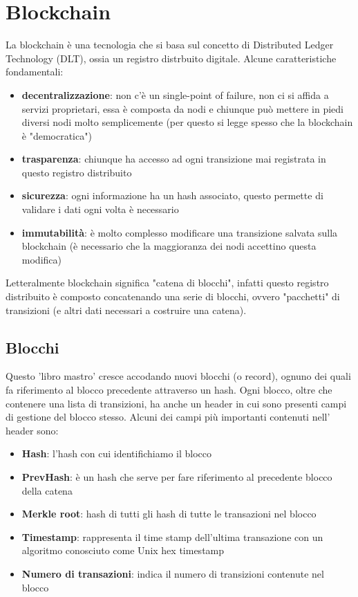 \section{Blockchain}
La blockchain è una tecnologia che si basa sul concetto di Distributed Ledger Technology (DLT), ossia un registro distrbuito digitale. Alcune caratteristiche fondamentali:
\begin{itemize}
  \item {\bfseries decentralizzazione}: non c'è un single-point of failure, non ci si affida a servizi proprietari, essa è composta da nodi e chiunque può mettere in piedi diversi nodi molto semplicemente (per questo si legge spesso che la blockchain è "democratica")
  \item {\bfseries trasparenza}: chiunque ha accesso ad ogni transizione mai registrata in questo registro distribuito
  \item {\bfseries sicurezza}: ogni informazione ha un hash associato, questo permette di validare i dati ogni volta è necessario
	\item {\bfseries immutabilità}: è molto complesso modificare una transizione salvata sulla blockchain (è necessario che la maggioranza dei nodi accettino questa modifica)
\end{itemize}

Letteralmente blockchain significa "catena di blocchi", infatti questo registro distribuito è composto concatenando una serie di blocchi, ovvero "pacchetti" di transizioni (e altri dati necessari a costruire una catena).

\subsection{Blocchi}
Questo 'libro mastro' cresce accodando nuovi blocchi (o record), ognuno dei quali fa riferimento al blocco precedente attraverso un hash.
Ogni blocco, oltre che contenere una lista di transizioni, ha anche un header in cui sono presenti campi di gestione del blocco stesso.
Alcuni dei campi più importanti contenuti nell' header sono:
\begin{itemize}
    \item {\bfseries Hash}: l'hash con cui identifichiamo il blocco
	\item {\bfseries PrevHash}: è un hash che serve per fare riferimento al precedente blocco della catena
	\item {\bfseries Merkle root}: hash di tutti gli hash di tutte le transazioni nel blocco
	\item {\bfseries Timestamp}: rappresenta il time stamp dell'ultima transazione con un algoritmo conosciuto come Unix hex timestamp
	\item {\bfseries Numero di transazioni}: indica il numero di transizioni contenute nel blocco
\end{itemize}

